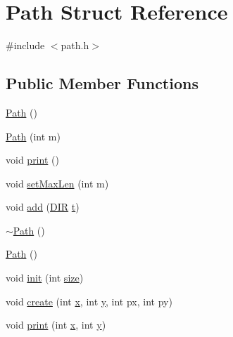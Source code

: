 \hypertarget{struct_path}{\section{Path Struct Reference}
\label{struct_path}
}


{\ttfamily \#include $<$path.\+h$>$}

\subsection*{Public Member Functions}
\begin{DoxyCompactItemize}
\item 
\hyperlink{struct_path_af26cfab021ddf49af73da3b2beca85ac}{Path} ()
\item 
\hyperlink{struct_path_a6d10e7e278f139f9a9bb331c6663637f}{Path} (int m)
\item 
void \hyperlink{struct_path_a88122b492a3c550f03b66b4d91198c5d}{print} ()
\item 
void \hyperlink{struct_path_a9c8285042c96f9e46b4b1580a9f7fbf7}{set\+Max\+Len} (int m)
\item 
void \hyperlink{struct_path_a8ca4768f44455b55e3cd8b02e0a50c35}{add} (\hyperlink{path_8h_a49eb6ac4643553d04b85c70646c6786d}{D\+I\+R} \hyperlink{readhtk_8m_aaccc9105df5383111407fd5b41255e23}{t})
\item 
\hyperlink{struct_path_a141da9ff89c85e0ba410b5a73864c267}{$\sim$\+Path} ()
\item 
\hyperlink{struct_path_af26cfab021ddf49af73da3b2beca85ac}{Path} ()
\item 
void \hyperlink{struct_path_a76d7e0cfeec9a365d9d2cdb4cf94386c}{init} (int \hyperlink{struct_path_a3020a9bdb6f4181571b616468577627a}{size})
\item 
void \hyperlink{struct_path_a01b0c21c26eca649f0d45c5403a03a09}{create} (int \hyperlink{rastafilt_8m_ae1674a322a8fdaf497b48f50e749ddac}{x}, int \hyperlink{rastafilt_8m_a86d95dcd476896268e6f41d4bcc8c2fc}{y}, int px, int py)
\item 
void \hyperlink{struct_path_a27c8f61321579810b2b6267415825f29}{print} (int \hyperlink{rastafilt_8m_ae1674a322a8fdaf497b48f50e749ddac}{x}, int \hyperlink{rastafilt_8m_a86d95dcd476896268e6f41d4bcc8c2fc}{y})
\end{DoxyCompactItemize}
